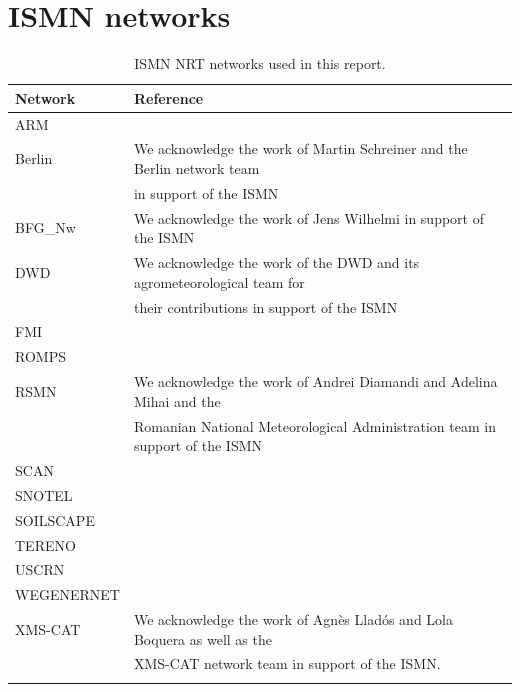 \FloatBarrier
\clearpage

\section{ISMN networks} \label{sec:ismn_networks}

\begin{table}[htb]
\centering
\small
\begin{tabular}{@{}ll@{}}
\toprule
Network     & Reference \\ \midrule
ARM         & \cite{Cook2016a,Cook2016b,Cook2018} \\
Berlin      & We acknowledge the work of Martin Schreiner and the Berlin network team \\
            & in support of the ISMN \\
BFG\_Nw     & We acknowledge the work of Jens Wilhelmi in support of the ISMN \\
DWD         & We acknowledge the work of the DWD and its agrometeorological team for \\
            & their contributions in support of the ISMN \\
FMI         & \cite{Ikonen2016,Ikonen2018} \\
ROMPS       & \cite{Zech2020} \\
RSMN        & We acknowledge the work of Andrei Diamandi and Adelina Mihai and the \\
            & Romanian National Meteorological Administration team in support of the ISMN \\
SCAN        & \cite{Schaefer2007} \\
SNOTEL      & \cite{Leavesley2008} \\
SOILSCAPE   & \cite{Shuman2010,Moghaddam2011,Moghaddam2016} \\
TERENO      & \cite{Bogena2012,Bogena2016,Bogena2018} \\
USCRN       & \cite{Bell2013} \\
WEGENERNET  & \cite{Kirchengast2014,Fuchsberger2021} \\
XMS-CAT     & We acknowledge the work of Agnès Lladós and Lola Boquera as well as the \\
            & XMS-CAT network team in support of the ISMN. \\
            &           \\ \bottomrule
\end{tabular}
\caption{\ac{ISMN} \ac{NRT} networks used in this report.}
\label{tab:ismn_refs}
\end{table}



